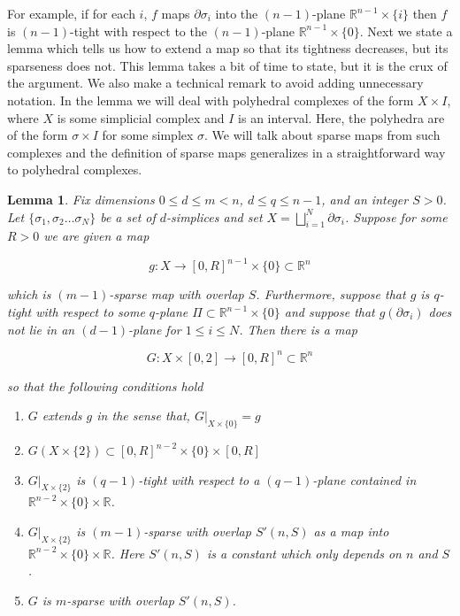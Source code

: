 \documentclass[12pt]{article}
\newtheorem{lemma}{Lemma}
\newcommand{\RR}{\mathbb{R}}
\begin{document}
	For example, if for each $i$, $f$ maps $\partial \sigma_i$ into the $(n-1)$-plane $\RR^{n-1} \times \{i\}$ then $f$ is $(n-1)$-tight with respect to the $(n-1)$-plane $\RR^{n-1} \times \{0\}$. Next we state a lemma which tells us how to extend a map so that its tightness decreases, but its sparseness does not. This lemma takes a bit of time to state, but it is the crux of the argument. We also make a technical remark to avoid adding unnecessary notation. In the lemma we will deal with polyhedral complexes of the form $X \times I$, where $X$ is some simplicial complex and $I$ is an interval. Here, the polyhedra are of the form $\sigma \times I$ for some simplex $\sigma$. We will talk about sparse maps from such complexes and the definition of sparse maps generalizes in a straightforward way to polyhedral complexes.
	
	\begin{lemma} \label{tight} Fix  dimensions $0 \le d \le m < n$, $d \le q \le n-1$, and an integer $S > 0$. Let $\{\sigma_1, \sigma_2 \ldots \sigma_N\}$ be a set of $d$-simplices and set $X = \bigsqcup_{i=1}^N \partial \sigma_i$. Suppose for some $R > 0$ we are given a map
		
		$$g: X \to [0,R]^{n-1} \times \{0\} \subset \RR^n$$
		
		\noindent which is $(m-1)$-sparse map with overlap $S$. Furthermore, suppose that $g$ is $q$-tight with respect to some $q$-plane $\Pi \subset \RR^{n-1} \times \{0\}$ and suppose that $g(\partial \sigma_i)$ does not lie in an $(d-1)$-plane for $1 \le i \le N$. Then there is a map
		
		$$G: X \times [0,2] \to  [0, R]^{n} \subset \RR^n$$
		
		\noindent so that the following conditions hold
		
		\begin{enumerate}
			\item $G$ extends $g$ in the sense that, $G|_{X \times \{0\}} = g$
			\item $G(X \times \{2\}) \subset [0,R]^{n-2} \times \{0\} \times [0,R]$
			\item $G|_{X \times \{2\}}$ is $(q-1)$-tight with respect to a $(q-1)$-plane contained in $\RR^{n-2} \times \{0\} \times \RR$.
			\item $G|_{X \times \{2\}}$ is $(m-1)$-sparse with overlap $S'(n,S)$ as a map into $\RR^{n-2} \times \{0\} \times \RR$. Here $S'(n,S)$ is a constant which only depends on $n$ and $S$.
			\item $G$ is $m$-sparse with overlap $S'(n,S)$.
		\end{enumerate} 
		
	\end{lemma}
	
\end{document}
